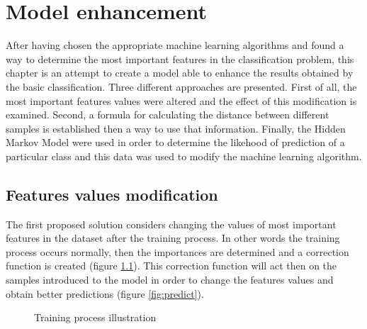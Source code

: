 \chapter{Model enhancement}
After having chosen the appropriate machine learning algorithms and found a way to determine the most important features in the classification problem, this chapter is an attempt to create a model able to enhance the results obtained by the basic classification. Three different approaches are presented. First of all, the most important features values were altered and the effect of this modification is examined. Second, a formula for calculating the distance between different samples is established then a way to use that information. Finally, the Hidden Markov Model were used in order to determine the likehood of prediction of a particular class and this data was used to modify the machine learning algorithm. 

\section{Features values modification} \label{sec:feat}
The first proposed solution considers changing the values of most important features in the dataset after the training process. In other words the training process occurs normally, then the importances are determined and a correction function is created (figure \ref{fig:train}). This correction function will act then on the samples introduced to the model in order to change the features values and obtain better predictions (figure \ref{fig:predict}). 

\begin{figure}[H]
    \centering
    \caption{Training process illustration} \label{fig:train}
\end{figure}

